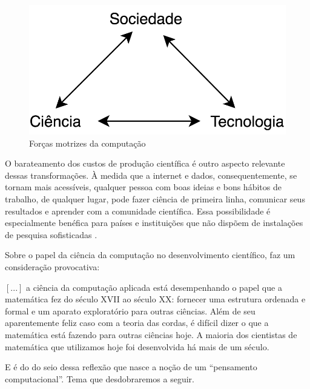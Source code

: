 \begin{figure}[!htb]
	\caption{Forças motrizes da computação}
	\begin{center}
	    \includegraphics[scale=0.28]{imagens/forcas_motriz.png}
	\end{center}
\end{figure}

O barateamento dos custos de produção científica é outro aspecto relevante dessas transformações. À medida que a internet e dados, consequentemente, se tornam mais acessíveis, qualquer pessoa com boas ideias e bons hábitos de trabalho, de qualquer lugar, pode fazer ciência de primeira linha, comunicar seus resultados e aprender com a comunidade científica. Essa possibilidade é especialmente benéfica para países e instituições que não dispõem de instalações de pesquisa sofisticadas \cite[]{Djorgovski2005}. 

Sobre o papel da ciência da computação no desenvolvimento científico,  faz um consideração provocativa: 

\begin{citacao}
	$[...]$ a ciência da computação aplicada está desempenhando o papel que a matemática fez do século XVII ao século XX: fornecer uma estrutura ordenada e formal e um aparato exploratório para outras ciências. Além de seu aparentemente feliz caso com a teoria das cordas, é difícil dizer o que a matemática está fazendo para outras ciências hoje. A maioria dos cientistas de matemática que utilizamos hoje foi desenvolvida há mais de um século. \cite[p.~131. Tradução nossa]{Djorgovski2005}
\end{citacao}

E é do do seio dessa reflexão que nasce a noção de um ``pensamento computacional''. Tema que desdobraremos a seguir.